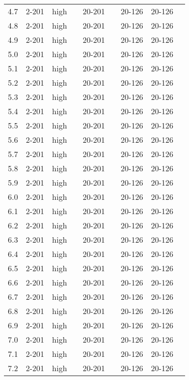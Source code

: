 \documentclass{article}
\begin{document}
\begin{center}
\begin{tabular}{| c | c | c | c | c | c | c | c | c |}
      4.7 & 2-201 & high &  & 20-201 &  & 20-126 & 20-126 &\\
      4.8 & 2-201 & high &  & 20-201 &  & 20-126 & 20-126 &\\
      4.9 & 2-201 & high &  & 20-201 &  & 20-126 & 20-126 &\\
      5.0 & 2-201 & high &  & 20-201 &  & 20-126 & 20-126 &\\
      5.1 & 2-201 & high &  & 20-201 &  & 20-126 & 20-126 &\\
      5.2 & 2-201 & high &  & 20-201 &  & 20-126 & 20-126 &\\
      5.3 & 2-201 & high &  & 20-201 &  & 20-126 & 20-126 &\\
      5.4 & 2-201 & high &  & 20-201 &  & 20-126 & 20-126 &\\
      5.5 & 2-201 & high &  & 20-201 &  & 20-126 & 20-126 &\\
      5.6 & 2-201 & high &  & 20-201 &  & 20-126 & 20-126 &\\
      5.7 & 2-201 & high &  & 20-201 &  & 20-126 & 20-126 &\\
      5.8 & 2-201 & high &  & 20-201 &  & 20-126 & 20-126 &\\
      5.9 & 2-201 & high &  & 20-201 &  & 20-126 & 20-126 &\\
      6.0 & 2-201 & high &  & 20-201 &  & 20-126 & 20-126 &\\
      6.1 & 2-201 & high &  & 20-201 &  & 20-126 & 20-126 &\\
      6.2 & 2-201 & high &  & 20-201 &  & 20-126 & 20-126 &\\
      6.3 & 2-201 & high &  & 20-201 &  & 20-126 & 20-126 &\\
      6.4 & 2-201 & high &  & 20-201 &  & 20-126 & 20-126 &\\
      6.5 & 2-201 & high &  & 20-201 &  & 20-126 & 20-126 &\\
      6.6 & 2-201 & high &  & 20-201 &  & 20-126 & 20-126 &\\
      6.7 & 2-201 & high &  & 20-201 &  & 20-126 & 20-126 &\\
      6.8 & 2-201 & high &  & 20-201 &  & 20-126 & 20-126 &\\
      6.9 & 2-201 & high &  & 20-201 &  & 20-126 & 20-126 &\\
      7.0 & 2-201 & high &  & 20-201 &  & 20-126 & 20-126 &\\
      7.1 & 2-201 & high &  & 20-201 &  & 20-126 & 20-126 &\\
      7.2 & 2-201 & high &  & 20-201 &  & 20-126 & 20-126 &\\

\end{tabular}
\end{center}
\end{document}
